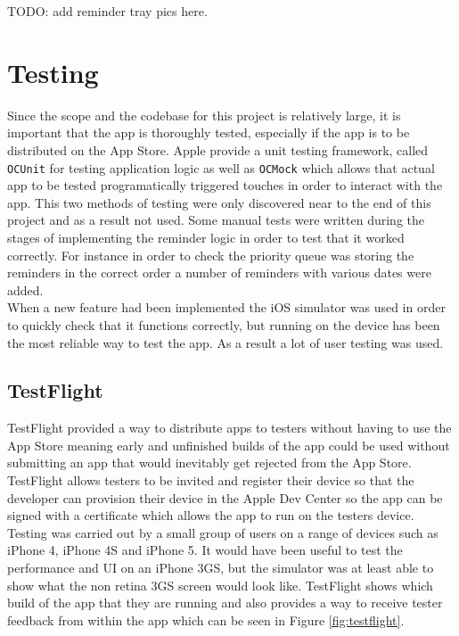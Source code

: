 \documentclass[12pt]{report}
\begin{document}
TODO: add reminder tray pics here.

\section{Testing}

Since the scope and the codebase for this project is relatively large, it is important that the app is thoroughly tested, especially if the app is to be distributed on the App Store. Apple provide a unit testing framework, called \texttt{OCUnit} for testing application logic as well as \texttt{OCMock} which allows that actual app to be tested programatically triggered touches in order to interact with the app. This two methods of testing were only discovered near to the end of this project and as a result not used. Some manual tests were written during the stages of implementing the reminder logic in order to test that it worked correctly. For instance in order to check the priority queue was storing the reminders in the correct order a number of reminders with various dates were added.\\

When a new feature had been implemented the iOS simulator was used in order to quickly check that it functions correctly, but running on the device has been the most reliable way to test the app. As a result a lot of user testing was used.

\subsection{TestFlight}

TestFlight \cite{testflight} provided a way to distribute apps to testers without having to use the App Store meaning early and unfinished builds of the app could be used without submitting an app that would inevitably get rejected from the App Store. TestFlight allows testers to be invited and register their device so that the developer can provision their device in the Apple Dev Center so the app can be signed with a certificate which allows the app to run on the testers device.\\

Testing was carried out by a small group of users on a range of devices such as iPhone 4, iPhone 4S and iPhone 5. It would have been useful to test the performance and UI on an iPhone 3GS, but the simulator was at least able to show what the non retina 3GS screen would look like. TestFlight shows which build of the app that they are running and also provides a way to receive tester feedback from within the app which can be seen in Figure \ref{fig:testflight}. 
\end{document}

